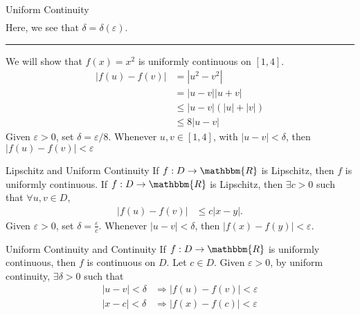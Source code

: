 \documentclass[10pt]{extarticle}
\newcommand{\R}{\mathbbm{R}}
\begin{document}
\begin{problem}{Uniform Continuity}
\begin{align*}
    \end{align*}
    Here, we see that $\delta = \delta(\varepsilon)$.\\
    \vspace{4pt}
    \rule{\textwidth}{0.4pt}
    \vspace{4pt}
    We will show that $f(x) = x^2$ is uniformly continuous on $[1,4]$.
    \begin{align*}
      |f(u) - f(v)| &= |u^2 - v^2|\\
                    &= |u-v||u+v|\\
                    &\leq |u-v|\left(|u| + |v|\right)\tag*{Triangle Inequality}\\
                    &\leq 8|u-v|
    \end{align*}
    Given $\varepsilon > 0$, set $\delta = \varepsilon/8$. Whenever $u,v\in [1,4]$, with $|u-v| < \delta$, then $|f(u)-f(v)| < \varepsilon$
  \end{problem}
  \begin{problem}{Lipschitz and Uniform Continuity}
    If $f: D\rightarrow \R$ is Lipschitz, then $f$ is uniformly continuous.
    \tcblower
    If $f: D\rightarrow \R$ is Lipschitz, then $\exists c > 0$ such that $\forall u,v\in D$,
    \begin{align*}
      |f(u) - f(v)| &\leq c|x-y|.
    \end{align*}
    Given $\varepsilon > 0$, set $\delta = \frac{\varepsilon}{c}$. Whenever $|u-v| < \delta$, then $|f(x) - f(y)| < \varepsilon$.
  \end{problem}
  \begin{problem}{Uniform Continuity and Continuity}
    If $f: D\rightarrow \R$ is uniformly continuous, then $f$ is continuous on $D$.
    \tcblower
    Let $c\in D$. Given $\varepsilon > 0$, by uniform continuity, $\exists \delta > 0$ such that 
    \begin{align*}
      |u-v| < \delta &\Rightarrow |f(u)-f(v)| < \varepsilon\\
      |x-c| < \delta &\Rightarrow |f(x)-f(c)| < \varepsilon
    \end{align*}
  \end{problem}
\end{document}
